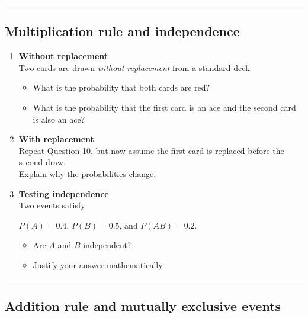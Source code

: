 \documentclass[
  letterpaper,
  DIV=11,
  numbers=noendperiod]{scrreprt}
\providecommand{\tightlist}{%
  \setlength{\itemsep}{0pt}\setlength{\parskip}{0pt}}
\begin{document}
\begin{center}\rule{0.5\linewidth}{0.5pt}\end{center}

\subsection{Multiplication rule and
independence}\label{multiplication-rule-and-independence}

\begin{enumerate}
\def\labelenumi{\arabic{enumi}.}
\setcounter{enumi}{9}
\item
  \textbf{Without replacement}\\
  Two cards are drawn \emph{without replacement} from a standard deck.

  \begin{itemize}
  \tightlist
  \item
    What is the probability that both cards are red?\\
  \item
    What is the probability that the first card is an ace and the second
    card is also an ace?
  \end{itemize}
\item
  \textbf{With replacement}\\
  Repeat Question 10, but now assume the first card is replaced before
  the second draw.\\
  Explain why the probabilities change.
\item
  \textbf{Testing independence}\\
  Two events satisfy

  \(P(A)=0.4\), \(P(B)=0.5\), and \(P(AB)=0.2\).

  \begin{itemize}
  \tightlist
  \item
    Are \(A\) and \(B\) independent?\\
  \item
    Justify your answer mathematically.
  \end{itemize}
\end{enumerate}

\begin{center}\rule{0.5\linewidth}{0.5pt}\end{center}

\subsection{Addition rule and mutually exclusive
events}\label{addition-rule-and-mutually-exclusive-events}
\end{document}
